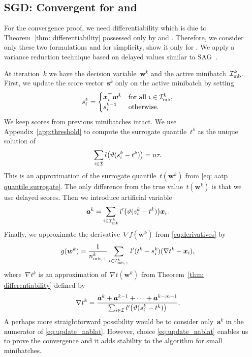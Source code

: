 \subsection{SGD: Convergent for \PatMat and \PatMatNP}

For the convergence proof, we need differentiability which is due to Theorem~\ref{thm: differentiability} possessed only by \PatMat and \PatMatNP. Therefore, we consider only these two formulations and for simplicity, show it only for \PatMat. We apply a variance reduction technique based on delayed values similar to SAG~\cite{schmidt2017minimizing}. 

At iteration~$k$ we have the decision variable~$\bm{w}^k$ and the active minibatch~$\mathcal{I}_{\text{mb}}^k$. First, we update the score vector~$\bm{s}^k$ only on the active minibatch by setting
\begin{equation}\label{eq:defin_z}
  s_i^k = \begin{cases}
    \bm{x}_i^\top \bm{w}^k & \text{for all } i \in \mathcal{I}_{\text{mb}}^k, \\
    s_i^{k-1} & \text{otherwise.}
  \end{cases} 
\end{equation}
We keep scores from previous minibatches intact. We use Appendix~\ref{app:threshold} to compute the surrogate quantile~$t^k$ as the unique solution of
\begin{equation}\label{eq:update_t}
  \sum_{i \in \I}l\Brac{\vartheta(s_i^k - t^k)} = n\tau.
\end{equation}
This is an approximation of the surrogate quantile~$t(\bm{w}^k)$ from \eqref{eq: aatp quantile surrogate}. The only difference from the true value~$t(\bm{w}^k)$ is that we use delayed scores. Then we introduce artificial variable
\begin{equation}\label{eq:update_a}
  \bm{a}^k = \sum_{i \in \Imb^k} l'\Brac{\vartheta(s_i^k - t^k)}\bm{x}_i.
\end{equation}
Finally, we approximate the derivative~$\nabla f(\bm{w}^k)$ from \eqref{eq:derivatives} by
\begin{equation}\label{eq:update_g}
  g(\bm{w}^k) = \frac{1}{n_{\text{mb},+}^k} \sum_{i \in \mathcal{I}_{\text{mb},+}^k} l'(t^k - s_i^k)(\nabla t^k - \bm{x}_i),
\end{equation}
where~$\nabla t^k$ is an approximation of~$\nabla t(\bm{w}^k)$ from Theorem~\ref{thm: differentiability} defined by
\begin{equation}\label{eq:update_nablat}
  \nabla t^k
    = \frac{\bm{a}^k + \bm{a}^{k-1} + \dots + \bm{a}^{k - m + 1}}{\sum_{i \in \I} l'\Brac{\vartheta(s_i^k - t^k)}}.
\end{equation}
A perhaps more straightforward possibility would be to consider only~$\bm{a}^k$ in the numerator of \eqref{eq:update_nablat}. However, choice \eqref{eq:update_nablat} enables us to prove the convergence and it adds stability to the algorithm for small minibatches.

